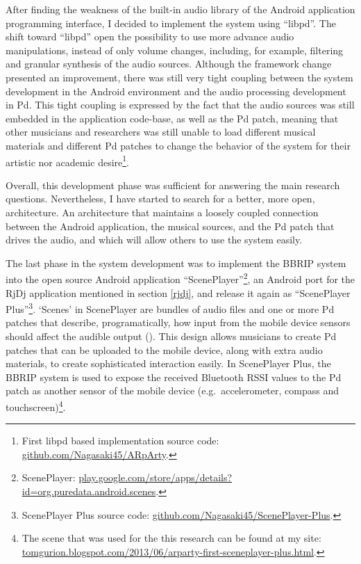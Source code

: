 \documentclass[a4paper,11pt]{article}
\begin{document}
{After finding the weakness of the built-in audio library of the Android application programming interface, I decided to implement the system using ``libpd''.
The shift toward ``libpd'' open the possibility to use more advance audio manipulations, instead of only volume changes, including, for example, filtering and granular synthesis of the audio sources.
Although the framework change presented an improvement, there was still very tight coupling between the system development in the Android environment and the audio processing development in Pd.
This tight coupling is expressed by the fact that the audio sources was still embedded in the application code-base, as well as the Pd patch, meaning that other musicians and researchers was still unable to load different musical materials and different Pd patches to change the behavior of the system for their artistic nor academic desire\footnote{First libpd based implementation source code: \href{https://github.com/Nagasaki45/ARpArty}{github.com/Nagasaki45/ARpArty}.}.

Overall, this development phase was sufficient for answering the main research questions.
Nevertheless, I have started to search for a better, more open, architecture.
An architecture that maintains a loosely coupled connection between the Android application, the musical sources, and the Pd patch that drives the audio, and which will allow others to use the system easily.

The last phase in the system development was to implement the BBRIP system into the open source Android application ``ScenePlayer''\footnote{ScenePlayer: \href{http://play.google.com/store/apps/details?id=org.puredata.android.scenes}{play.google.com/store/apps/details?id=org.puredata.android.scenes}.}, an Android port for the RjDj application mentioned in section \ref{rjdj}, and release it again as ``ScenePlayer Plus''\footnote{ScenePlayer Plus source code: \href{https://github.com/Nagasaki45/ScenePlayer-Plus}{github.com/Nagasaki45/ScenePlayer-Plus}.}.
`Scenes' in ScenePlayer are bundles of audio files and one or more Pd patches that describe, programatically, how input from the mobile device sensors should affect the audible output (\cite[p. 29]{brinkmann12}).
This design allows musicians to create Pd patches that can be uploaded to the mobile device, along with extra audio materials, to create sophisticated interaction easily.
In ScenePlayer Plus, the BBRIP system is used to expose the received Bluetooth RSSI values to the Pd patch as another sensor of the mobile device (e.g.\ accelerometer, compass and touchscreen)\footnote{The scene that was used for the this research can be found at my site: \href{http://tomgurion.blogspot.com/2013/06/arparty-first-sceneplayer-plus.html}{tomgurion.blogspot.com/2013/06/arparty-first-sceneplayer-plus.html}.}.

}
\end{document}
